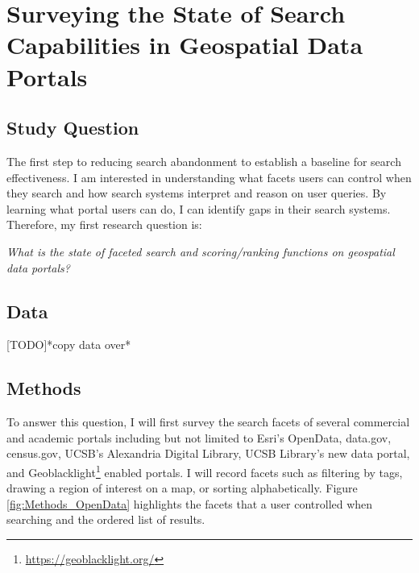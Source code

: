 \section{Surveying the State of Search Capabilities in Geospatial Data Portals}

\subsection{Study Question}
The first step to reducing search abandonment to establish a baseline for search effectiveness. I am interested in understanding what facets users can control when they search and how search systems interpret and reason on user queries. By learning what portal users can do, I can identify gaps in their search systems. Therefore, my first research question is:
\linebreak

\emph{What is the state of faceted search and scoring/ranking functions on geospatial data portals?}

\subsection{Data}
[TODO]*copy data over*

\subsection{Methods}
To answer this question, I will first survey the search facets of several commercial and academic portals including but not limited to Esri's OpenData, data.gov, census.gov, UCSB's Alexandria Digital Library, UCSB Library's new data portal, and Geoblacklight\footnote{\url{https://geoblacklight.org/}} enabled portals. I will record facets such as filtering by tags, drawing a region of interest on a map, or sorting alphabetically. Figure \ref{fig:Methods_OpenData} highlights the facets that a user controlled when searching and the ordered list of results.


